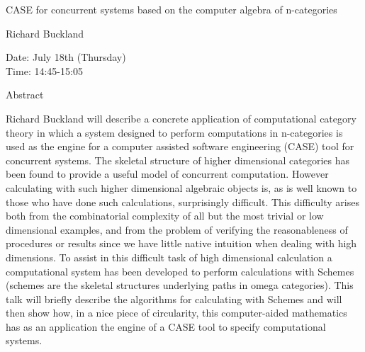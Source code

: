 \begin{center}
\LARGE
CASE for concurrent systems based on the computer algebra
                         of n-categories

\end{center}

\begin{center}
\Large
Richard Buckland

\end{center}

\noindent
Date: July 18th (Thursday)\\
Time:  14:45-15:05\\

\begin{center}
\large
Abstract
\end{center}

Richard Buckland will describe a concrete application of computational category theory in which
a system designed to perform computations in n-categories is used as the engine for a computer
assisted software engineering (CASE) tool for concurrent systems. The skeletal structure of higher
dimensional categories has been found to provide a useful model of concurrent computation.
However calculating with such higher dimensional algebraic objects is, as is well known to those
who have done such calculations, surprisingly difficult. This difficulty arises both from the
combinatorial complexity of all but the most trivial or low dimensional examples, and from the
problem of verifying the reasonableness of procedures or results since we have little native
intuition when dealing with high dimensions. To assist in this difficult task of high dimensional
calculation a computational system has been developed to perform calculations with Schemes
(schemes are the skeletal structures underlying paths in omega categories). This talk will briefly
describe the algorithms for calculating with Schemes and will then show how, in a nice piece of
circularity, this computer-aided mathematics has as an application the engine of a CASE tool to
specify computational systems. 

